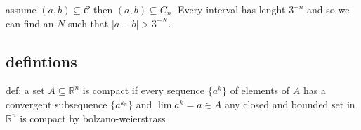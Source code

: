 \documentclass[letterpaper]{article}
\begin{document}
assume $(a,b)\subseteq\mathcal{C}$ then $(a,b)\subseteq C_n$. Every interval has lenght $3^{-n}$ and so we can find an $N$ such that $|a-b|>3^{-N}$.

\subsection*{defintions}
def: a set $A\subseteq\mathbb{R}^n$ is compact if every sequence $\{a^k\}$ of elements of $A$ has a convergent subsequence $\{a^{k_n}\}$ and $\lim a^k=a\in A$ any closed and bounded set in $\mathbb{R}^n$ is compact by bolzano-weierstrass
\end{document}
